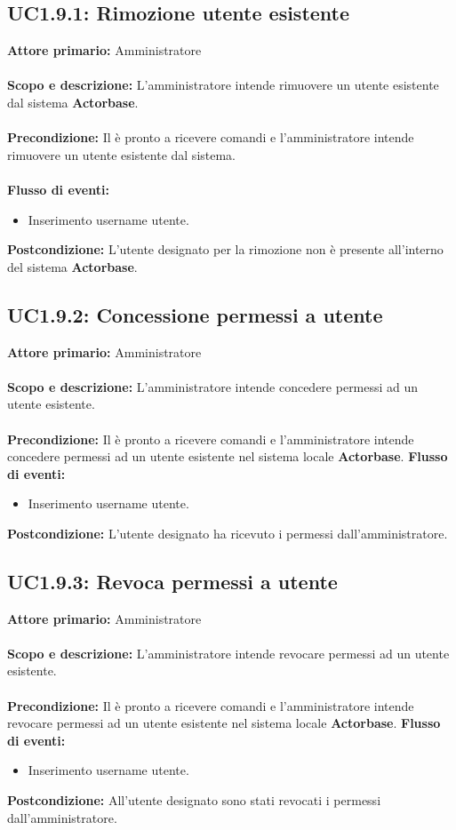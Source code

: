 \documentclass{scalatekids-article}
\begin{document}
\subsection{UC1.9.1: Rimozione utente esistente}
\textbf{Attore primario:} Amministratore\\ \\
\textbf{Scopo e descrizione:} L'amministratore intende rimuovere un utente esistente dal sistema \textbf{Actorbase}.\\ \\
\textbf{Precondizione:} Il  è pronto a ricevere comandi e l'amministratore intende rimuovere un utente esistente dal sistema.\\ \\
\textbf{Flusso di eventi:}
\begin{itemize}
\item Inserimento username utente.
\end{itemize}
\textbf{Postcondizione:} L'utente designato per la rimozione non è presente all'interno del sistema \textbf{Actorbase}.
\subsection{UC1.9.2: Concessione permessi a utente}
\textbf{Attore primario:} Amministratore\\ \\
\textbf{Scopo e descrizione:} L'amministratore intende concedere permessi ad un utente esistente.\\ \\
\textbf{Precondizione:} Il  è pronto a ricevere comandi e l'amministratore intende concedere permessi ad un utente esistente nel sistema locale \textbf{Actorbase}.
\textbf{Flusso di eventi:}
\begin{itemize}
\item Inserimento username utente.
\end{itemize}
\textbf{Postcondizione:} L'utente designato ha ricevuto i permessi dall'amministratore.
\subsection{UC1.9.3: Revoca permessi a utente}
\textbf{Attore primario:} Amministratore\\ \\
\textbf{Scopo e descrizione:} L'amministratore intende revocare permessi ad un utente esistente.\\ \\
\textbf{Precondizione:} Il  è pronto a ricevere comandi e l'amministratore intende revocare permessi ad un utente esistente nel sistema locale \textbf{Actorbase}.
\textbf{Flusso di eventi:}
\begin{itemize}
\item Inserimento username utente.
\end{itemize}
\textbf{Postcondizione:} All'utente designato sono stati revocati i permessi dall'amministratore.
\end{document}
